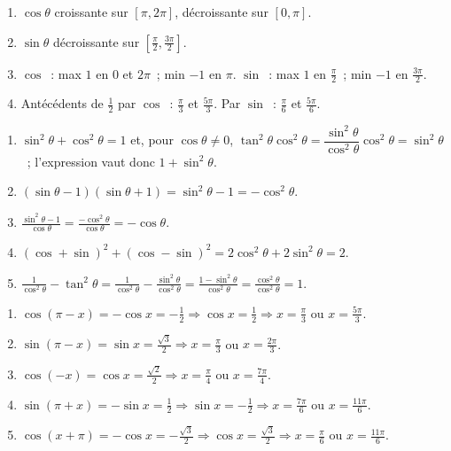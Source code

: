 
\begin{enumerate}
  \item $\cos\theta$ croissante sur $[\pi,2\pi]$, d\'ecroissante sur $[0,\pi]$.
  \item $\sin\theta$ d\'ecroissante sur $[\frac{\pi}{2},\frac{3\pi}{2}]$.
  \item $\cos$~: max $1$ en $0$ et $2\pi$~; min $-1$ en $\pi$.
        $\sin$~: max $1$ en $\frac{\pi}{2}$~; min $-1$ en $\frac{3\pi}{2}$.
  \item Ant\'ec\'edents de $\frac{1}{2}$ par $\cos$~: $\frac{\pi}{3}$ et $\frac{5\pi}{3}$.
        Par $\sin$~: $\frac{\pi}{6}$ et $\frac{5\pi}{6}$.
\end{enumerate}


\begin{enumerate}
  \item $\sin^2\theta+\cos^2\theta=1$ et, pour $\cos\theta\ne0$, $\tan^2\theta\cos^2\theta=\dfrac{\sin^2\theta}{\cos^2\theta}\cos^2\theta=\sin^2\theta$~;
        l'expression vaut donc $1+\sin^2\theta$.
  \item $(\sin\theta-1)(\sin\theta+1)=\sin^2\theta-1=-\cos^2\theta$.
  \item $\frac{\sin^2\theta-1}{\cos\theta}=\frac{-\cos^2\theta}{\cos\theta}=-\cos\theta$.
  \item $(\cos+\sin)^2+(\cos-\sin)^2=2\cos^2\theta+2\sin^2\theta=2$.
  \item $\frac{1}{\cos^2\theta}-\tan^2\theta=\frac{1}{\cos^2\theta}-\frac{\sin^2\theta}{\cos^2\theta}=\frac{1-\sin^2\theta}{\cos^2\theta}=\frac{\cos^2\theta}{\cos^2\theta}=1$.
\end{enumerate}


\begin{enumerate}
  \item $\cos(\pi-x)=-\cos x=-\frac{1}{2}\Rightarrow\cos x=\frac{1}{2}\Rightarrow x=\frac{\pi}{3}$ ou $x=\frac{5\pi}{3}$.
  \item $\sin(\pi-x)=\sin x=\frac{\sqrt{3}}{2}\Rightarrow x=\frac{\pi}{3}$ ou $x=\frac{2\pi}{3}$.
  \item $\cos(-x)=\cos x=\frac{\sqrt{2}}{2}\Rightarrow x=\frac{\pi}{4}$ ou $x=\frac{7\pi}{4}$.
  \item $\sin(\pi+x)=-\sin x=\frac{1}{2}\Rightarrow\sin x=-\frac{1}{2}\Rightarrow x=\frac{7\pi}{6}$ ou $x=\frac{11\pi}{6}$.
  \item $\cos(x+\pi)=-\cos x=-\frac{\sqrt{3}}{2}\Rightarrow\cos x=\frac{\sqrt{3}}{2}\Rightarrow x=\frac{\pi}{6}$ ou $x=\frac{11\pi}{6}$.
\end{enumerate}

